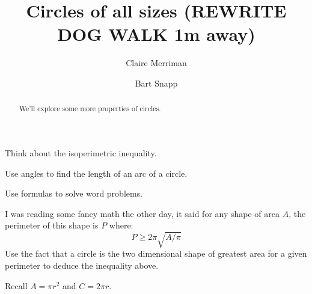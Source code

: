 \documentclass[noauthor,hints,nooutcomes,handout]{ximera}
\title{Circles of all sizes (REWRITE DOG WALK 1m away)}
\author{Claire Merriman \and Bart Snapp}
\begin{document}
\begin{abstract}
  We'll explore some more properties of circles.
\end{abstract}
\maketitle

\begin{listOutcomes}
  \item Think about the isoperimetric inequality.
\item Use angles to find the length of an arc of a circle.
\item Use formulas to solve word problems.
\end{listOutcomes}



\mynewpage

\begin{question}
  I was reading some fancy math the other day, it said for any shape
  of area $A$, the perimeter of this shape is $P$ where:
  \[
  P \ge 2\pi\sqrt{A/\pi}
  \]
  Use the fact that a circle is the two dimensional shape of greatest
  area for a given perimeter to deduce the inequality above.
  \begin{hint} Recall $A = \pi r^2$ and $C = 2\pi r$.
  \end{hint}
\end{question}
\mynewpage
\end{document}
